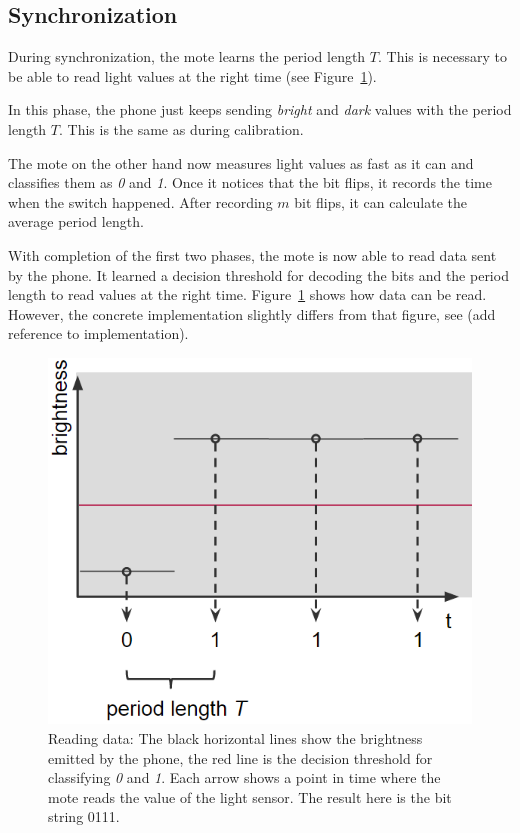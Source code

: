 \documentclass{sig-alternate} %
\begin{document}
\subsection{Synchronization}
\label{sub:synchronization}

During synchronization, the mote learns the period length $T$.
This is necessary to be able to read light values at the right time (see Figure~\ref{fig:read_a_bit}).

In this phase, the phone just keeps sending \textit{bright} and \textit{dark} values with the period length $T$.
This is the same as during calibration.

The mote on the other hand now measures light values as fast as it can and classifies them as \textit{0} and \textit{1}.
Once it notices that the bit flips, it records the time when the switch happened.
After recording $m$ bit flips, it can calculate the average period length.

With completion of the first two phases, the mote is now able to read data sent by the phone.
It learned a decision threshold for decoding the bits and the period length to read values at the right time.
Figure~\ref{fig:read_a_bit} shows how data can be read. 
However, the concrete implementation slightly differs from that figure, see (add reference to implementation).

\begin{figure}
	\centering
	\includegraphics[scale=.5]{images/reading_data.png}
	\caption{Reading data: The black horizontal lines show the brightness emitted by the phone, the red line is the decision threshold for classifying \textit{0} and \textit{1}. Each arrow shows a point in time where the mote reads the value of the light sensor. The result here is the bit string 0111.}
	\label{fig:read_a_bit}
\end{figure}
\end{document}
